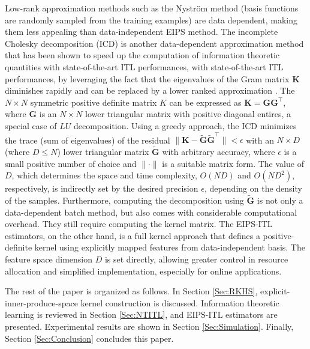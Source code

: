 \documentclass[8pt,twocolumn]{IEEEtran}
\newcommand{\G}{\mathbf{G}}
\providecommand{\norm}[1]{\lVert#1\rVert}
\begin{document}
Low-rank approximation methods such as the Nystr\"{o}m method \cite{Williams00Nystrom} (basis functions are randomly sampled from the training examples) are data dependent, making them less appealing than data-independent EIPS method. The incomplete Cholesky decomposition (ICD) is another data-dependent approximation method that has been shown to speed up the computation of information theoretic quantities with state-of-the-art ITL performances, with state-of-the-art ITL performances, by leveraging the fact that the eigenvalues of the Gram matrix $\mathbf{K}$ diminishes rapidly and can be replaced by a lower ranked approximation \cite{Bach05ICD, Seth09}. The $N \times N$ symmetric positive definite matrix $K$ can be expressed as $\mathbf{K}=\mathbf{G}\mathbf{G}^\intercal$, where $\mathbf{G}$ is an $N\times N$ lower triangular matrix with positive diagonal entires, a special case of $LU$ decomposition. Using a greedy approach, the ICD minimizes the trace (sum of eigenvalues) of the residual $\norm{\mathbf{K}-\tilde{\mathbf{G}}\tilde{\mathbf{G}}^\intercal}<\epsilon$ with an $N\times D$ (where $D\leq N$) lower triangular matrix $\tilde{\G}$ with arbitrary accuracy, where $\epsilon$ is a small positive number of choice and $\norm{\cdot}$ is a suitable matrix form. The value of $D$, which determines the space and time complexity, $O(ND)$ and $O(ND^2)$, respectively, is indirectly set by the desired precision $\epsilon$, depending on the density of the samples. Furthermore, computing the decomposition using $\tilde{\G}$ is not only a data-dependent batch method, but also comes with considerable computational overhead. They still require computing the kernel matrix. The EIPS-ITL estimators, on the other hand, is a full kernel approach that defines a positive-definite kernel using explicitly mapped features from data-independent basis. The feature space dimension $D$ is set directly, allowing greater control in resource allocation and simplified implementation, especially for online applications.

The rest of the paper is organized as follows. In Section \ref{Sec:RKHS}, explicit-inner-produce-space kernel construction is discussed. Information theoretic learning is reviewed in Section \ref{Sec:NTITL}, and EIPS-ITL estimators are presented. Experimental results are shown in Section \ref{Sec:Simulation}. Finally, Section \ref{Sec:Conclusion} concludes this paper.
\end{document}
